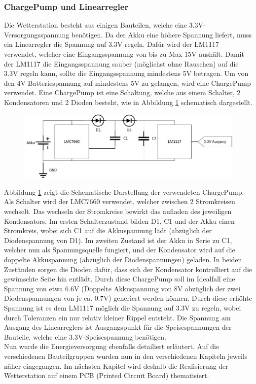 \subsubsection{ChargePump und Linearregler}
Die Wetterstation besteht aus einigen Bauteilen, welche eine 3.3V-Versorgungsspannung benötigen. Da der Akku eine höhere Spannung liefert, muss ein Linearregler die Spannung auf 3.3V regeln. Dafür wird der LM1117 verwendet, welcher eine Eingangsspannung von bis zu Max 15V aushält. Damit der LM1117 die Eingangsspannung sauber (möglichst ohne Rauschen) auf die 3.3V regeln kann, sollte die Eingangsspannung mindestens 5V betragen. Um von den 4V Batteriespannung auf mindestens 5V zu gelangen, wird eine ChargePump verwendet. Eine ChargePump ist eine Schaltung, welche aus einem Schalter, 2 Kondensatoren und 2 Dioden besteht, wie in Abbildung \ref{fig:ChargePump} schematisch dargestellt. 

\begin{figure}[h]
\centering
\includegraphics[width=1\textwidth]{graphics/Energieversorgung/ChargePump.JPG}
\label{fig:ChargePump}
\end{figure}
\newpage
Abbildung \ref{fig:ChargePump} zeigt die Schematische Darstellung der verwendeten ChargePump. Als Schalter wird der LMC7660 verwendet, welcher zwischen 2 Stromkreisen wechselt. Das wechseln der Stromkreise bewirkt das aufladen des jeweiligen Kondensators. Im ersten Schalterzustand bilden D1, C1 und der Akku einen Stromkreis, wobei sich C1 auf die Akkuspannung lädt (abzüglich der Diodenspannung von D1). Im zweiten Zustand ist der Akku in Serie zu C1, welcher nun als Spannungsquelle fungiert, und der Kondensator wird auf die doppelte Akkuspannung (abzüglich der Diodenspannungen) geladen. In beiden Zuständen sorgen die Dioden dafür, dass sich der Kondensator kontrolliert auf die gewünschte Seite hin entlädt. Durch diese ChargePump soll im Idealfall eine Spannung von etwa 6.6V (Doppelte Akkuspannung von 8V abzüglich der zwei Diodenspannungen von je ca. 0.7V) generiert werden können. Durch diese erhöhte Spannung ist es dem LM1117 möglich die Spannung auf 3.3V zu regeln, wobei durch Toleranzen ein nur relativ kleiner Rippel entsteht. Die Spannung am Ausgang des Linearreglers ist Ausgangspunkt für die Speisespannungen der Bauteile, welche eine 3.3V-Speisespannung benötigen.\\[0.5cm]
Nun wurde die Energieversorgung ebenfalls detailiert erläutert. Auf die verschiedenen Bauteilgruppen wurden nun in den verschiedenen Kapiteln jeweils näher eingegangen. Im nächsten Kapitel wird deshalb die Realisierung der Wetterstation auf einem PCB (Printed Circuit Board) thematisiert.
